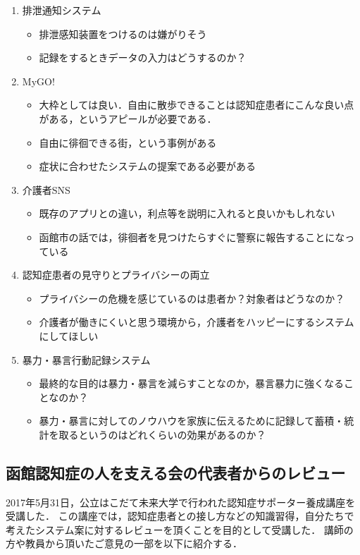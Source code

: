 \documentclass[../report]{subfiles}
\begin{document}
\begin{enumerate}
    \item[] 排泄通知システム
\begin{itemize}
    \item 排泄感知装置をつけるのは嫌がりそう
    \item 記録をするときデータの入力はどうするのか？
\end{itemize}

    \item[] MyGO!
\begin{itemize}
    \item 大枠としては良い．自由に散歩できることは認知症患者にこんな良い点がある，というアピールが必要である．
    \item 自由に徘徊できる街，という事例がある\cite{haikai}
    \item 症状に合わせたシステムの提案である必要がある
\end{itemize}

    \item[] 介護者SNS
\begin{itemize}
    \item 既存のアプリとの違い，利点等を説明に入れると良いかもしれない
    \item 函館市の話では，徘徊者を見つけたらすぐに警察に報告することになっている
\end{itemize}

    \item[] 認知症患者の見守りとプライバシーの両立
\begin{itemize}
    \item プライバシーの危機を感じているのは患者か？対象者はどうなのか？
    \item 介護者が働きにくいと思う環境から，介護者をハッピーにするシステムにしてほしい
\end{itemize}

    \item[] 暴力・暴言行動記録システム
\begin{itemize}
    \item 最終的な目的は暴力・暴言を減らすことなのか，暴言暴力に強くなることなのか？
    \item 暴力・暴言に対してのノウハウを家族に伝えるために記録して蓄積・統計を取るというのはどれくらいの効果があるのか？
\end{itemize}
\end{enumerate}


\subsection{函館認知症の人を支える会の代表者からのレビュー} \label{sec:4_hyouka_before2}
2017年5月31日，公立はこだて未来大学で行われた認知症サポーター養成講座を受講した．
この講座では，認知症患者との接し方などの知識習得，自分たちで考えたシステム案に対するレビューを頂くことを目的として受講した．
講師の方や教員から頂いたご意見の一部を以下に紹介する．
\end{document}
